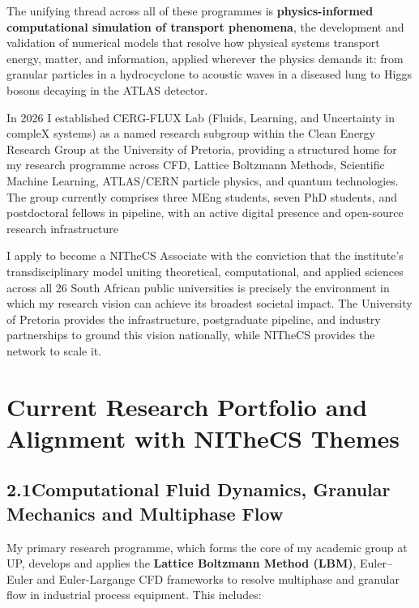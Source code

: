 \documentclass[11pt,a4paper]{article}
\begin{document}
The unifying thread across all of these programmes is \textbf{physics-informed computational simulation of transport phenomena}, the development and validation of numerical models 
that resolve how physical systems transport energy, matter, and information, applied wherever the physics demands it: from granular particles in a 
hydrocyclone to acoustic waves in a diseased lung to Higgs bosons decaying in the ATLAS detector.

In 2026 I established CERG-FLUX Lab (Fluids, Learning, and Uncertainty in compleX systems) as a named research subgroup within the Clean Energy Research Group at the University of Pretoria, 
providing a structured home for my research programme across CFD, Lattice Boltzmann Methods, Scientific Machine Learning, ATLAS/CERN particle physics, and quantum technologies. 
The group currently comprises three MEng students, seven PhD students, and postdoctoral fellows in pipeline, with an active digital presence and open-source research infrastructure

I apply to become a NITheCS Associate with the conviction that the institute's 
transdisciplinary model uniting theoretical, computational, and applied sciences across all 26 South African public 
universities is precisely the environment in which my research vision can achieve its broadest societal impact. 
The University of Pretoria provides the infrastructure, postgraduate pipeline, and industry partnerships to ground this vision nationally, while NITheCS 
provides the network to scale it.

\section{Current Research Portfolio and Alignment with NITheCS Themes}

\subsection{2.1\quad Computational Fluid Dynamics, Granular Mechanics and Multiphase Flow}

My primary research programme, which forms the core of my academic group at UP, develops and applies the \textbf{Lattice Boltzmann Method (LBM)}, Euler--Euler and Euler-Largange CFD frameworks to resolve multiphase and granular flow in industrial process equipment. This includes:
\end{document}

